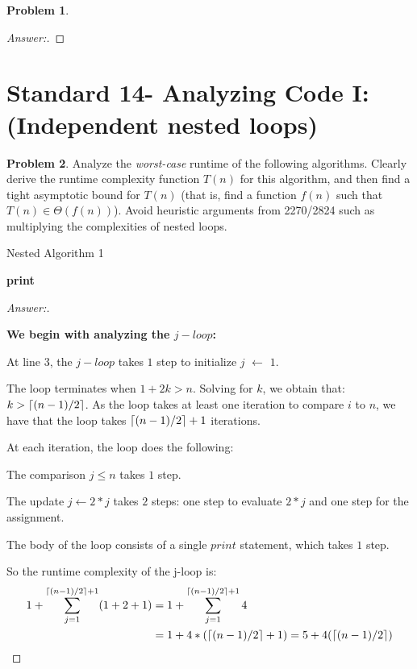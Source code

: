 \documentclass[11pt]{article}
\DeclarePairedDelimiter\ceil{\lceil}{\rceil}
\theoremstyle{definition}
\theoremstyle{definition}
\newtheorem{required}{Problem}
\theoremstyle{definition}
\begin{document}
\begin{required}
\begin{enumerate}[label=(\alph*)]
\begin{proof}[Answer:]
        \end{proof}
\end{enumerate}

\end{required}

\newpage
\section{Standard 14- Analyzing Code I: (Independent nested loops)}
\begin{required}


Analyze the \textit{worst-case} runtime of the following algorithms. Clearly derive the runtime complexity function $T(n)$ for this algorithm, and then find a tight asymptotic bound for $T(n)$ (that is, find a function $f(n)$ such that $T(n) \in \Theta(f(n))$). Avoid heuristic arguments from 2270/2824 such as multiplying the complexities of nested loops.



\begin{algorithm}
\caption{Nested Algorithm 1}\label{alg:Nested2}
\begin{algorithmic}[1]
		\State \textbf{print} 
	\EndFor
\EndFor
\EndProcedure
\end{algorithmic}
\end{algorithm}
\begin{proof}[Answer:] \

\item \textbf{We begin with analyzing the $j-loop$:}
\item At line $3$, the $j-loop$ takes $1$ step to initialize $j$ $\leftarrow$ $1$.
\item The loop terminates when $1 + 2k > n$. Solving for $k$, we obtain that: $k > \ceil*{(n - 1)/2}$. As the loop takes at least one iteration to compare $i$ to $n$, we have that the loop takes $\ceil*{(n - 1)/2} + 1$ iterations.
\item At each iteration, the loop does the following:
\item \hspace*{10mm} The comparison $j \leq n$ takes $1$ step.
\item \hspace*{10mm} The update $j \leftarrow 2*j$ takes $2$ steps: one step to evaluate $2*j$ and one step for the assignment.
\item \hspace*{10mm} The body of the loop consists of a single $print$ statement, which takes $1$ step.
\item So the runtime complexity of the j-loop is:
\begin{align*}
1 + \sum_{j=1}^{\ceil*{(n - 1)/2} + 1} (1 + 2 + 1) &= 1 +  \sum_{j=1}^{\ceil*{(n - 1)/2} + 1} 4 \\
&= 1 + 4 * (\ceil*{(n - 1)/2} + 1) = 5 + 4(\ceil*{(n - 1)/2})
\end{align*}


\end{proof}
\end{required}
\end{document}
